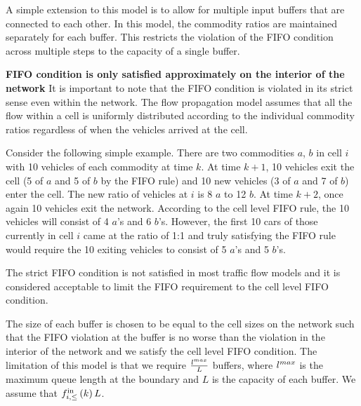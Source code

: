 A simple extension to this model is to allow for multiple input buffers that are connected to each other. In this model, the commodity ratios are maintained separately for each buffer. This restricts the violation of the FIFO condition across multiple steps to the capacity of a single buffer. 

\begin{remark}
\textbf{FIFO condition is only satisfied approximately on the interior of the network} 
It is important to note that the FIFO condition is violated in its strict sense even within the network. The flow propagation model assumes that all the flow within a cell is uniformly distributed according to the individual commodity ratios regardless of when the vehicles arrived at the cell. 
\begin{example}
Consider the following simple example. There are two commodities $a$, $b$ in cell $i$ with 10 vehicles of each commodity at time $k$. At time $k+1$, 10 vehicles exit the cell (5 of $a$ and 5 of $b$ by the FIFO rule) and 10 new vehicles (3 of $a$ and 7 of $b$) enter the cell. The new ratio of vehicles at $i$ is 8 $a$ to 12 $b$. At time $k+2$, once again 10 vehicles exit the network. According to the cell level FIFO rule, the 10 vehicles will consist of 4 $a$'s and 6 $b$'s. However, the first 10 cars of those currently in cell $i$ came at the ratio of 1:1 and truly satisfying the FIFO rule would require the 10 exiting vehicles to consist of 5 $a$'s and 5 $b$'s.   
\end{example}
The strict FIFO condition is not satisfied in most traffic flow models and it is considered acceptable to limit the FIFO requirement to the cell level FIFO condition. 
\end{remark}

The size of each buffer is chosen to be equal to the cell sizes on the network such that the FIFO violation at the buffer is no worse than the violation in the interior of the network and we satisfy the cell level FIFO condition. The limitation of this model is that we require $\frac{l^{max}}{L}$ buffers, where $l^{max}$ is the maximum queue length at the boundary and $L$ is the capacity of each buffer. We assume that $f_{i,\leq}^{\text{in}}\left(k\right){L}$.\\

